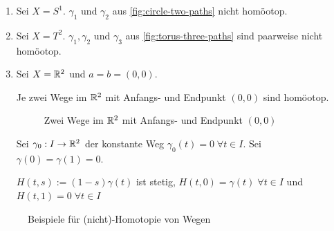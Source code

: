 \begin{beispiel}
    \begin{enumerate}[label=\arabic*)]
        \item Sei $X = S^1$. $\gamma_1$ und $\gamma_2$ aus 
              \cref{fig:circle-two-paths} nicht homöotop.
        \item Sei $X = T^2$. $\gamma_1, \gamma_2$ und $\gamma_3$
              aus \cref{fig:torus-three-paths} sind paarweise
              nicht homöotop.
        \item Sei $X = \mathbb{R}^2$ und $a=b=(0,0)$. 

              Je zwei Wege im $\mathbb{R}^2$ mit Anfangs- und Endpunkt $(0,0)$
              sind homöotop.

              \begin{figure}
                \centering
                
                \caption{Zwei Wege im $\mathbb{R}^2$ mit Anfangs- und Endpunkt $(0,0)$}
                \label{fig:paths-from-origin}
              \end{figure}

              Sei $\gamma_0: I \rightarrow \mathbb{R}^2$ der konstante Weg
              $\gamma_0(t) = 0 \; \forall t \in I$. Sei
              $\gamma(0) = \gamma(1) = 0$.

              $H(t,s) := (1-s) \gamma(t)$ ist stetig, 
              $H(t,0) = \gamma(t)\; \forall t \in I$ und
              $H(t,1) = 0 \; \forall t \in I$
    \end{enumerate}

    \begin{figure}[ht]
        \centering
        \label{fig:homotop-paths}
        \caption{Beispiele für (nicht)-Homotopie von Wegen}
    \end{figure}
\end{beispiel}

